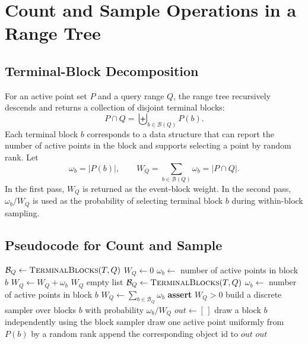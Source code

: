 \documentclass[11pt]{article}
\newcommand{\Bcal}{\mathcal B}
\begin{document}
\section{Count and Sample Operations in a Range Tree}

\subsection{Terminal-Block Decomposition}

For an active point set \(P\) and a query range \(Q\), the range tree recursively descends and returns a collection of disjoint terminal blocks:
\[
 P\cap Q=\biguplus_{b\in\Bcal(Q)}P(b).
\]
Each terminal block \(b\) corresponds to a data structure that can report the number of active points in the block and supports selecting a point by random rank. Let
\[
 \omega_b=|P(b)|,
 \qquad
 W_Q=\sum_{b\in\Bcal(Q)}\omega_b=|P\cap Q|.
\]
In the first pass, \(W_Q\) is returned as the event-block weight. In the second pass, \(\omega_b/W_Q\) is used as the probability of selecting terminal block \(b\) during within-block sampling.

\subsection{Pseudocode for Count and Sample}

\begin{algorithm}[t]
\caption{Local Count and Sample in a Range Tree}
\label{alg:rt-count-sample}
\begin{algorithmic}[1]
    \State $\Bcal_Q \gets \Call{TerminalBlocks}{T,Q}$
    \State $W_Q\gets 0$
    \ForAll{$b\in\Bcal_Q$}
        \State $\omega_b\gets$ number of active points in block $b$
        \State $W_Q\gets W_Q+\omega_b$
    \EndFor
    \State \Return $W_Q$
\EndFunction
\Statex
{}
        \State \Return empty list
    \EndIf
    \State $\Bcal_Q \gets \Call{TerminalBlocks}{T,Q}$
    \ForAll{$b\in\Bcal_Q$}
        \State $\omega_b\gets$ number of active points in block $b$
    \EndFor
    \State $W_Q\gets\sum_{b\in\Bcal_Q}\omega_b$
    \State \textbf{assert} $W_Q>0$
    \State build a discrete sampler over blocks $b$ with probability $\omega_b/W_Q$
    \State $\textit{out}\gets[\,]$
        \State draw a block $b$ independently using the block sampler
        \State draw one active point uniformly from $P(b)$ by a random rank
        \State append the corresponding object id to $\textit{out}$
    \EndFor
    \State \Return $\textit{out}$
\EndFunction
\end{algorithmic}
\end{algorithm}
\end{document}
